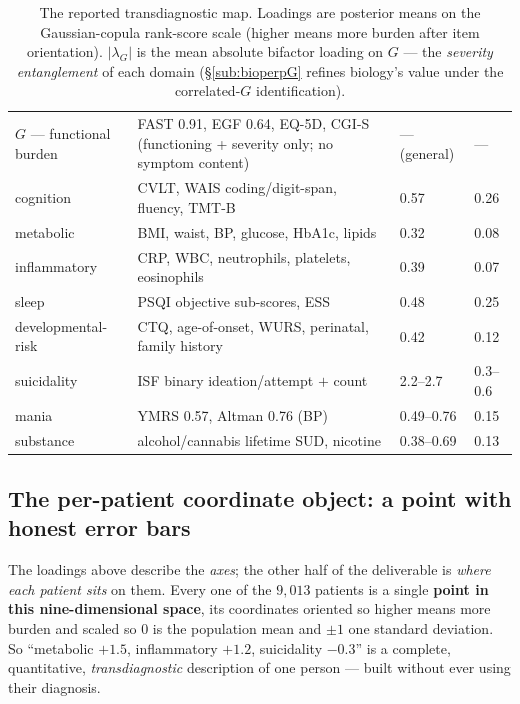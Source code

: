 \begin{table}[h]\centering\small\sffamily
\caption{The reported transdiagnostic map. Loadings are posterior means on the Gaussian-copula rank-score scale
(higher means more burden after item orientation). $|\lambda_G|$ is the mean absolute bifactor loading on $G$
--- the \emph{severity entanglement} of each domain (\S\ref{sub:bioperpG} refines biology's value under the
correlated-$G$ identification).}
\label{tab:map}
\begin{tabular}{L{3.2cm} L{6.4cm} R{2.0cm} R{1.6cm}}
\toprule
{} &  &  & \\
\midrule
{} $G$ --- functional burden & FAST 0.91, EGF 0.64, EQ-5D, CGI-S (functioning + severity only; no symptom content) & --- (general) & ---\\
cognition & CVLT, WAIS coding/digit-span, fluency, TMT-B & 0.57 & 0.26\\
 metabolic & BMI, waist, BP, glucose, HbA1c, lipids & 0.32 & 0.08\\
inflammatory & CRP, WBC, neutrophils, platelets, eosinophils & 0.39 & 0.07\\
 sleep & PSQI objective sub-scores, ESS & 0.48 & 0.25\\
developmental-risk & CTQ, age-of-onset, WURS, perinatal, family history & 0.42 & 0.12\\
 suicidality & ISF binary ideation/attempt $+$ count & 2.2--2.7 & 0.3--0.6\\
mania & YMRS 0.57, Altman 0.76 (BP) & 0.49--0.76 & 0.15\\
 substance & alcohol/cannabis lifetime SUD, nicotine & 0.38--0.69 & 0.13\\
\bottomrule
\end{tabular}
\end{table}

\subsection{The per-patient coordinate object: a point with honest error bars}
\label{sub:coords}
The loadings above describe the \emph{axes}; the other half of the deliverable is \emph{where each patient
sits} on them. Every one of the $9{,}013$ patients is a single \textbf{point in this nine-dimensional space},
its coordinates oriented so higher means more burden and scaled so $0$ is the population mean and $\pm1$ one
standard deviation. So ``metabolic $+1.5$, inflammatory $+1.2$, suicidality $-0.3$'' is a complete,
quantitative, \emph{transdiagnostic} description of one person --- built without ever using their diagnosis.

